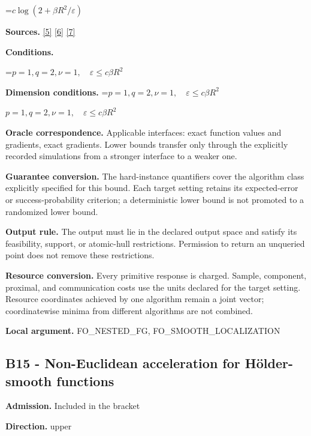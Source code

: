 \documentclass[10pt,a4paper]{article}
\newcommand{\AtlasMath}[1]{\par\begingroup\centering\setbox0=\hbox{$\displaystyle #1$}\ifdim\wd0>1.4\linewidth\typeout{ATLAS WIDE FORMULA: \the\wd0}\fi\ifdim\wd0>\linewidth\resizebox{\linewidth}{!}{\box0}\else\box0\fi\par\endgroup}
\newcommand{\AtlasInlineMath}[1]{\begingroup\setbox0=\hbox{$#1$}\ifdim\wd0>.4\linewidth\endgroup\AtlasMath{#1}\else\endgroup$#1$\fi}
\begin{document}
\AtlasMath{c\log(2+\beta R^2/\varepsilon)}


\textbf{Sources.} \href{https://arxiv.org/pdf/2101.09740v2}{[5]} \href{https://arxiv.org/pdf/2609.33360v2}{[6]} \href{https://arxiv.org/pdf/2609.10874}{[7]}



\textbf{Conditions.}
\AtlasMath{p=1,q=2,\nu=1,\quad\varepsilon\le c\beta R^2}




\textbf{Dimension conditions.} \AtlasInlineMath{p=1,q=2,\nu=1,\quad\varepsilon\le c\beta R^2}



\textbf{Oracle correspondence.} Applicable interfaces: exact function values and gradients, exact gradients. Lower bounds transfer only through the explicitly recorded simulations from a stronger interface to a weaker one.



\textbf{Guarantee conversion.} The hard-instance quantifiers cover the algorithm class explicitly specified for this bound. Each target setting retains its expected-error or success-probability criterion; a deterministic lower bound is not promoted to a randomized lower bound.



\textbf{Output rule.} The output must lie in the declared output space and satisfy its feasibility, support, or atomic-hull restrictions. Permission to return an unqueried point does not remove these restrictions.



\textbf{Resource conversion.} Every primitive response is charged. Sample, component, proximal, and communication costs use the units declared for the target setting. Resource coordinates achieved by one algorithm remain a joint vector; coordinatewise minima from different algorithms are not combined.



\textbf{Local argument.} FO\_NESTED\_FG, FO\_SMOOTH\_LOCALIZATION



\subsection{B15 - Non-Euclidean acceleration for Hölder-smooth functions}


\textbf{Admission.} Included in the bracket



\textbf{Direction.} upper
\end{document}
